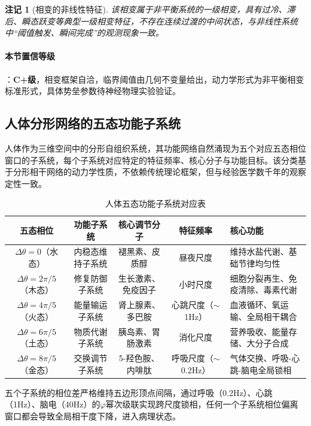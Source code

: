 \documentclass[12pt,a4paper,twocolumn]{article}
\renewcommand{\phi}{\varphi}
\newtheorem{remark}[theorem]{注记}
\begin{document}
\begin{remark}[相变的非线性特征]
该相变属于非平衡系统的一级相变，具有过冷、滞后、瞬态跃变等典型一级相变特征，不存在连续过渡的中间状态，与非线性系统中``阈值触发、瞬间完成''的观测现象一致。
\end{remark}

\paragraph{本节置信等级}：\textbf{C+级}，相变框架自洽，临界阈值由几何不变量给出，动力学形式为非平衡相变标准形式，具体势垒参数待神经物理实验验证。


\subsection{人体分形网络的五态功能子系统}
\label{subsec:five_subsystems}
人体作为三维空间中的分形自组织系统，其功能网络自然涌现为五个对应五态相位窗口的子系统，每个子系统对应特定的特征频率、核心分子与功能目标。该分类基于分形相干网络的动力学性质，不依赖传统理论框架，但与经验医学数千年的观察定性一致。

\begin{table}[H]
\centering
\footnotesize
\caption{人体五态功能子系统对应表}
\begin{tabular}{c|c|c|c|p{4cm}}
\hline
\textbf{五态相位} & \textbf{功能子系统} & \textbf{核心调节分子} & \textbf{特征频率} & \textbf{核心功能} \\
\hline
$\Delta\theta=0$（水态） & 内稳态维持子系统 & 褪黑素、皮质醇 & 昼夜尺度 & 维持水盐代谢、基础节律均匀性 \\
$\Delta\theta=2\pi/5$（木态） & 修复防御子系统 & 生长激素、免疫因子 & 小时尺度 & 细胞分裂再生、免疫清除、毒素代谢 \\
$\Delta\theta=4\pi/5$（火态） & 能量输运子系统 & 肾上腺素、多巴胺 & 心跳尺度（$\sim$1Hz） & 血液循环、氧运输、全局相干耦合 \\
$\Delta\theta=6\pi/5$（土态） & 物质代谢子系统 & 胰岛素、胃肠激素 & 消化尺度 & 营养吸收、能量存储、大分子合成 \\
$\Delta\theta=8\pi/5$（金态） & 交换调节子系统 & 5-羟色胺、内啡肽 & 呼吸尺度（$\sim$0.2Hz） & 气体交换、呼吸-心跳-脑电全局锁相 \\
\hline
\end{tabular}
\end{table}
五个子系统的相位差严格维持五边形顶点间隔，通过呼吸（0.2Hz）、心跳（1Hz）、脑电（40Hz）的$\phi$幂次级联实现跨尺度锁相，任何一个子系统相位偏离窗口都会导致全局相干度下降，进入病理状态。
\end{document}
